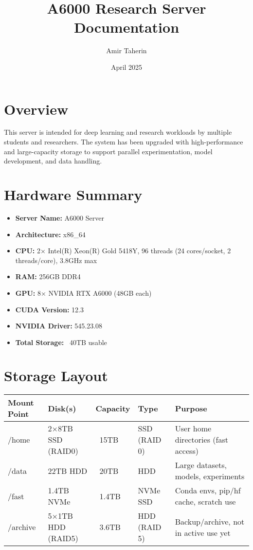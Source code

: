 \documentclass{article}
\title{A6000 Research Server Documentation}
\date{April 2025}
\author{Amir Taherin}
\begin{document}
\maketitle

\section*{Overview}
This server is intended for deep learning and research workloads by multiple students and researchers. The system has been upgraded with high-performance and large-capacity storage to support parallel experimentation, model development, and data handling.

\section*{Hardware Summary}
\begin{itemize}
  \item \textbf{Server Name:} A6000 Server
  \item \textbf{Architecture:} x86\_64
  \item \textbf{CPU:} 2× Intel(R) Xeon(R) Gold 5418Y, 96 threads (24 cores/socket, 2 threads/core), 3.8GHz max
  \item \textbf{RAM:} 256GB DDR4
  \item \textbf{GPU:} 8× NVIDIA RTX A6000 (48GB each)
  \item \textbf{CUDA Version:} 12.3
  \item \textbf{NVIDIA Driver:} 545.23.08
  \item \textbf{Total Storage:} ~40TB usable
\end{itemize}

\section*{Storage Layout}
\begin{longtable}{|l|l|l|l|p{6cm}|}
\hline
\textbf{Mount Point} & \textbf{Disk(s)} & \textbf{Capacity} & \textbf{Type} & \textbf{Purpose} \\
\hline
/home & 2×8TB SSD (RAID0) & ~15TB & SSD (RAID 0) & User home directories (fast access) \\
/data & 22TB HDD & ~20TB & HDD & Large datasets, models, experiments \\
/fast & 1.4TB NVMe & ~1.4TB & NVMe SSD & Conda envs, pip/hf cache, scratch use \\
/archive & 5×1TB HDD (RAID5) & ~3.6TB & HDD (RAID 5) & Backup/archive, not in active use yet \\
\hline
\end{longtable}
\end{document}
